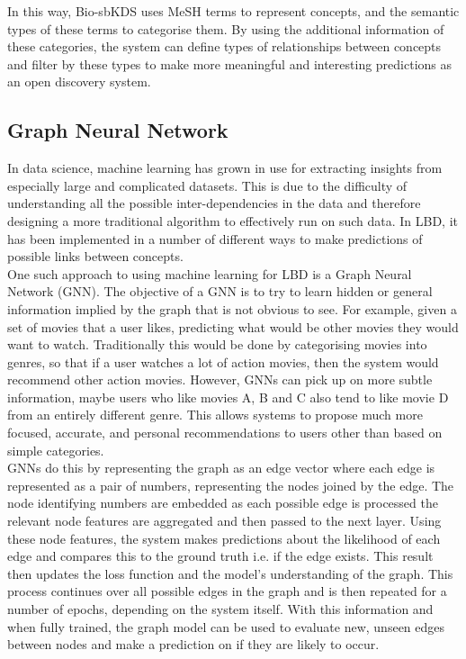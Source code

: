 \documentclass{l4proj}
\begin{document}
In this way, Bio-sbKDS uses MeSH terms to represent concepts, and the semantic types of these terms to categorise them. By using the additional information of these categories, the system can define types of relationships between concepts and filter by these types to make more meaningful and interesting predictions as an open discovery system. \\ 

\subsection{Graph Neural Network}

In data science, machine learning has grown in use for extracting insights from especially large and complicated datasets. This is due to the difficulty of understanding all the possible inter-dependencies in the data and therefore designing a more traditional algorithm to effectively run on such data. In LBD, it has been implemented in a number of different ways to make predictions of possible links between concepts. \\

One such approach to using machine learning for LBD is a Graph Neural Network (GNN). The objective of a GNN is to try to learn hidden or general information implied by the graph that is not obvious to see. For example, given a set of movies that a user likes, predicting what would be other movies they would want to watch. Traditionally this would be done by categorising movies into genres, so that if a user watches a lot of action movies, then the system would recommend other action movies. However, GNNs can pick up on more subtle information, maybe users who like movies A, B and C also tend to like movie D from an entirely different genre. This allows systems to propose much more focused, accurate, and personal recommendations to users other than based on simple categories. \\

GNNs do this by representing the graph as an edge vector where each edge is represented as a pair of numbers, representing the nodes joined by the edge. The node identifying numbers are embedded as each possible edge is processed the relevant node features are aggregated and then passed to the next layer. Using these node features, the system makes predictions about the likelihood of each edge and compares this to the ground truth i.e. if the edge exists. This result then updates the loss function and the model's understanding of the graph. This process continues over all possible edges in the graph and is then repeated for a number of epochs, depending on the system itself. With this information and when fully trained, the graph model can be used to evaluate new, unseen edges between nodes and make a prediction on if they are likely to occur. \\
\end{document}
